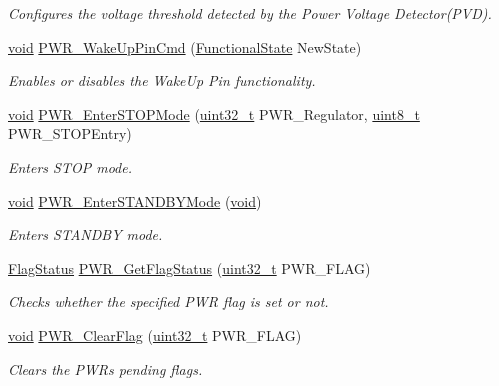 \begin{DoxyCompactItemize}
\begin{DoxyCompactList}\small\item\em Configures the voltage threshold detected by the Power Voltage Detector(\+P\+V\+D). \end{DoxyCompactList}\item 
\hyperlink{usb__devapi_8h_afabf60e7f57651d6d595a02c75f07cd0}{void} \hyperlink{group___p_w_r___private___functions_gae5fd6f9336ef8c60d5483651cb0d1a00}{P\+W\+R\+\_\+\+Wake\+Up\+Pin\+Cmd} (\hyperlink{agilefox_2library_2inc_2stm32f10x__type_8h_ac9a7e9a35d2513ec15c3b537aaa4fba1}{Functional\+State} New\+State)
\begin{DoxyCompactList}\small\item\em Enables or disables the Wake\+Up Pin functionality. \end{DoxyCompactList}\item 
\hyperlink{usb__devapi_8h_afabf60e7f57651d6d595a02c75f07cd0}{void} \hyperlink{group___p_w_r___private___functions_ga694676ac06a9baf50eae45adae0118ab}{P\+W\+R\+\_\+\+Enter\+S\+T\+O\+P\+Mode} (\hyperlink{_p_e___types_8h_a33594304e786b158f3fb30289278f5af}{uint32\+\_\+t} P\+W\+R\+\_\+\+Regulator, \hyperlink{_p_e___types_8h_aba7bc1797add20fe3efdf37ced1182c5}{uint8\+\_\+t} P\+W\+R\+\_\+\+S\+T\+O\+P\+Entry)
\begin{DoxyCompactList}\small\item\em Enters S\+T\+OP mode. \end{DoxyCompactList}\item 
\hyperlink{usb__devapi_8h_afabf60e7f57651d6d595a02c75f07cd0}{void} \hyperlink{group___p_w_r___private___functions_ga00ddae00a9c327b81b24d2597b0052f3}{P\+W\+R\+\_\+\+Enter\+S\+T\+A\+N\+D\+B\+Y\+Mode} (\hyperlink{usb__devapi_8h_afabf60e7f57651d6d595a02c75f07cd0}{void})
\begin{DoxyCompactList}\small\item\em Enters S\+T\+A\+N\+D\+BY mode. \end{DoxyCompactList}\item 
\hyperlink{agilefox_2library_2inc_2stm32f10x__type_8h_a89136caac2e14c55151f527ac02daaff}{Flag\+Status} \hyperlink{group___p_w_r___private___functions_gaa980163a4d83304280ee34942464b4ec}{P\+W\+R\+\_\+\+Get\+Flag\+Status} (\hyperlink{_p_e___types_8h_a33594304e786b158f3fb30289278f5af}{uint32\+\_\+t} P\+W\+R\+\_\+\+F\+L\+AG)
\begin{DoxyCompactList}\small\item\em Checks whether the specified P\+WR flag is set or not. \end{DoxyCompactList}\item 
\hyperlink{usb__devapi_8h_afabf60e7f57651d6d595a02c75f07cd0}{void} \hyperlink{group___p_w_r___private___functions_ga01c4b2fbd16514b993324e101c3ddf7c}{P\+W\+R\+\_\+\+Clear\+Flag} (\hyperlink{_p_e___types_8h_a33594304e786b158f3fb30289278f5af}{uint32\+\_\+t} P\+W\+R\+\_\+\+F\+L\+AG)
\begin{DoxyCompactList}\small\item\em Clears the P\+WR\textquotesingle{}s pending flags. \end{DoxyCompactList}\end{DoxyCompactItemize}


